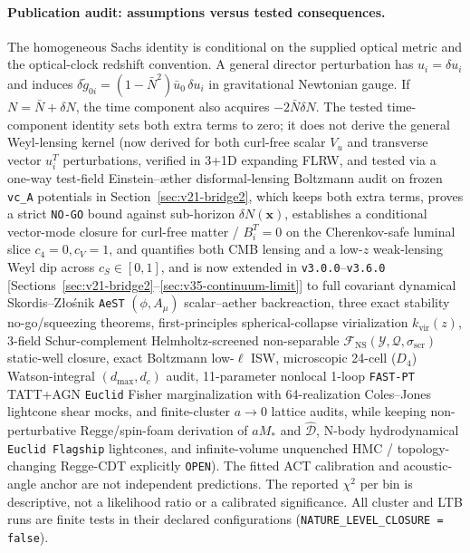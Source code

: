 \documentclass[11pt,a4paper]{article}
\begin{document}
\paragraph{Publication audit: assumptions versus tested consequences.}
The homogeneous Sachs identity is conditional on the supplied optical metric
and the optical-clock redshift convention. A general director
perturbation has $u_i=\delta u_i$ and induces
$\delta\tilde g_{0i}=(1-\bar N^2)\bar u_0\,\delta u_i$ in gravitational
Newtonian gauge. If $N=\bar N+\delta N$, the time component also acquires
$-2\bar N\delta N$. The tested time-component identity sets both extra
terms to zero; it does not derive the general Weyl-lensing kernel (now derived
for both curl-free scalar $V_u$ and transverse vector $u_i^T$ perturbations,
verified in 3+1D expanding FLRW, and tested via a one-way test-field Einstein--\ae{}ther
disformal-lensing Boltzmann audit on frozen \texttt{vc\_A} potentials in
Section~\ref{sec:v21-bridge2}, which keeps both extra terms, proves a strict
\texttt{NO-GO} bound against sub-horizon $\delta N(\mathbf{x})$, establishes a
conditional vector-mode closure for curl-free matter / $B_i^T = 0$ on the
Cherenkov-safe luminal slice $c_4 = 0, c_V = 1$, and quantifies both CMB lensing and a low-$z$ weak-lensing Weyl dip across $c_S \in [0, 1]$,
and is now extended in \texttt{v3.0.0}--\texttt{v3.6.0} [Sections~\ref{sec:v21-bridge2}--\ref{sec:v35-continuum-limit}] to full covariant dynamical
Skordis--Z{\l}o\'snik \texttt{AeST} $(\phi, A_\mu)$ scalar--aether backreaction,
three exact stability no-go/squeezing theorems, first-principles spherical-collapse
virialization $k_{\mathrm{vir}}(z)$, 3-field Schur-complement Helmholtz-screened
non-separable $\mathcal{F}_{\mathrm{NS}}(\mathcal{Y},\mathcal{Q},\sigma_{\mathrm{scr}})$ static-well closure,
exact Boltzmann low-$\ell$ ISW, microscopic 24-cell ($D_4$) Watson-integral $(d_{\max}, d_c)$ audit,
11-parameter nonlocal 1-loop \texttt{FAST-PT} TATT+AGN \texttt{Euclid} Fisher marginalization with
64-realization Coles--Jones lightcone shear mocks, and finite-cluster $a\to 0$ lattice audits, while keeping
non-perturbative Regge/spin-foam derivation of $a M_*$ and $\hat{\mathcal{D}}$, N-body hydrodynamical
\texttt{Euclid Flagship} lightcones, and infinite-volume unquenched HMC / topology-changing Regge-CDT explicitly \texttt{OPEN}).
The fitted ACT calibration and acoustic-angle anchor are not independent
predictions. The reported $\chi^2$ per bin is descriptive, not a likelihood
ratio or a calibrated significance. All cluster and LTB runs are finite
tests in their declared configurations (\texttt{NATURE\_LEVEL\_CLOSURE = false}).
\end{document}
